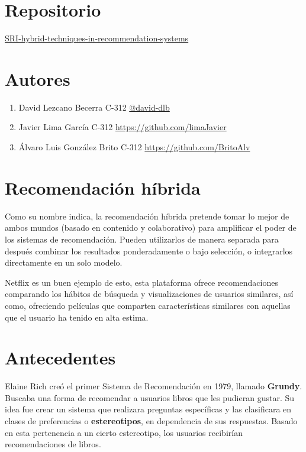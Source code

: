 \documentclass[14pt]{extarticle}
\begin{document}
\section{Repositorio}

\href{https://github.com/BritoAlv/SRI-hybrid-techniques-in-recommendation-systems}{SRI-hybrid-techniques-in-recommendation-systems}


\section{Autores}
\begin{enumerate}
    \item David Lezcano Becerra C-312 \href{https://github.com/david-dlb}{@david-dlb}
    \item Javier Lima García C-312 \href{@limaJavier}{https://github.com/limaJavier}
    \item Álvaro Luis González Brito C-312 \href{@BritoAlv}{https://github.com/BritoAlv}
\end{enumerate}


\section{Recomendación híbrida}

Como su nombre indica, la recomendación híbrida pretende tomar lo mejor de ambos mundos (basado en contenido y colaborativo) para amplificar el poder de los sistemas de recomendación. Pueden utilizarlos de manera separada para después combinar los resultados ponderadamente o bajo selección, o integrarlos directamente en un solo modelo.

Netflix es un buen ejemplo de esto, esta plataforma ofrece recomendaciones comparando los hábitos de búsqueda y visualizaciones de usuarios similares, así como, ofreciendo películas que comparten características similares con aquellas que el usuario ha tenido en alta estima.

\section{Antecedentes}

Elaine Rich creó el primer Sistema de Recomendación en 1979, llamado \textbf{Grundy}. Buscaba una forma de recomendar a usuarios libros que les pudieran gustar. Su idea fue crear un sistema que realizara preguntas específicas y las clasificara en clases de preferencias o \textbf{estereotipos}, en dependencia de sus respuestas. Basado en esta pertenencia a un cierto estereotipo, los usuarios recibirían recomendaciones de libros.
\end{document}
